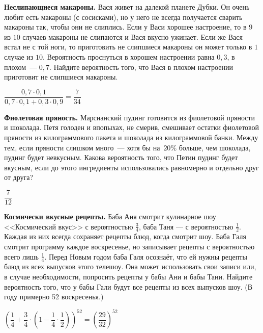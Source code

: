 \documentclass[12pt, addpoints]{exam} %
\begin{document}
\begin{questions}
\question \textbf{Неслипающиеся макароны.} Вася живет на далекой планете Дубки. Он очень любит есть макароны (с сосисками), но у него не всегда получается сварить макароны так, чтобы они не слиплись. Если у Васи хорошее настроение, то в $9$ из $10$ случаев макароны не слипаются и Вася вкусно ужинает.  Если же Вася встал не с той ноги, то приготовить не слипшиеся макароны он может только в $1$ случае из $10$. Вероятность проснуться в хорошем настроении равна $0,3$, в плохом~--- $0,7$. Найдите вероятность того, что Вася в плохом настроении приготовит не слипшиеся макароны.

\begin{solution}

$\dfrac{0,7 \cdot 0,1}{0,7 \cdot 0,1 + 0,3 \cdot 0,9} = \dfrac{7}{34}$
\end{solution}

\question \textbf{Фиолетовая пряность.} Марсианский пудинг готовится из фиолетовой пряности и шоколада. Петя голоден и впопыхах, не смерив, смешивает остатки фиолетовой пряности из килограммового пакета и шоколада из килограммовой банки. Между тем, если пряности слишком много~--- хотя бы на~$20\%$ больше, чем шоколада, пудинг будет невкусным. Какова вероятность того, что Петин пудинг будет вкусным, если до этого ингредиенты использовались равномерно и отдельно друг от друга?

\begin{solution}
$\dfrac{7}{12}$
\end{solution}



\question \textbf{Космически вкусные рецепты.} Баба Аня смотрит кулинарное шоу <<Космический вкус>> с вероятностью $\frac34$, баба Таня --- с вероятностью $\frac12$. Каждая из них всегда сохраняет рецепты блюд, когда смотрит шоу. Баба Галя смотрит программу каждое воскресенье, но записывает рецепты с вероятностью всего лишь $\frac14$. Перед Новым годом баба Галя осознаёт, что ей нужны рецепты блюд из всех выпусков этого телешоу. Она может использовать свои записи или, в случае необходимости, попросить рецепты у бабы Ани и бабы Тани. Найдите вероятность того, что у бабы Гали будут все рецепты из всех выпусков шоу. (В году примерно 52 воскресенья.)

\begin{solution}

$\left(\dfrac14 + \dfrac34\cdot\left(1 - \dfrac{1}{4}\cdot\dfrac12\right)\right)^{52} = \left(\dfrac{29}{32}\right)^{52} $
\end{solution}


\end{questions}
\end{document}
